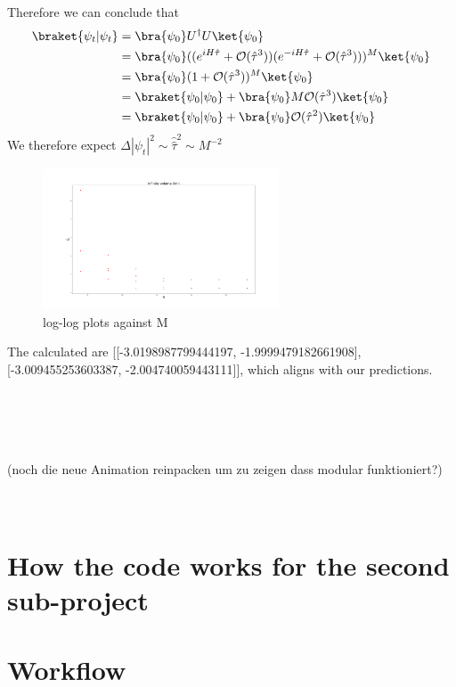 \documentclass[11pt, letterpaper, onecolumn]{article}
\begin{document}
Therefore we can conclude that
\begin{align*}
    \braket{\psi_t|\psi_t}&=\bra{\psi_0}U^\dagger U\ket{\psi_0}\\
    &=\bra{\psi_0}((e^{iH\hat{\tau}}+\mathcal{O}(\hat{\tau}^3))(e^{-iH\hat{\tau}}+\mathcal{O}(\hat{\tau}^3)))^M\ket{\psi_0}\\
    &=\bra{\psi_0}(1+\mathcal{O}(\hat{\tau}^3))^M\ket{\psi_0}\\
    &=\braket{\psi_0|\psi_0}+\bra{\psi_0}M\mathcal{O}(\hat{\tau}^3)\ket{\psi_0}\\
    &=\braket{\psi_0|\psi_0}+\bra{\psi_0}\mathcal{O}(\hat{\tau}^2)\ket{\psi_0}
\end{align*}
We therefore expect $\Delta|\psi_t|^2\sim\hat{\hat{\tau}}^2\sim M^{-2}$
	\begin{figure} [h] 
	\begin{center}
	\includegraphics[width=7cm]{"inf_vol_lim.png"}
	\caption{log-log plots against M}
	\end{center}
	\end{figure}
	The calculated are [[-3.0198987799444197, -1.9999479182661908], [-3.009455253603387, -2.004740059443111]], which aligns with our predictions.
	

	\\
 	\\
  	\\
   	\\
 	(noch die neue Animation reinpacken um zu zeigen dass modular funktioniert?)
  	\\
   	\\
    	\\
	
	\section{How the code works for the second sub-project}	
	
	
	
	
	\section{Workflow}
	
\end{document}
